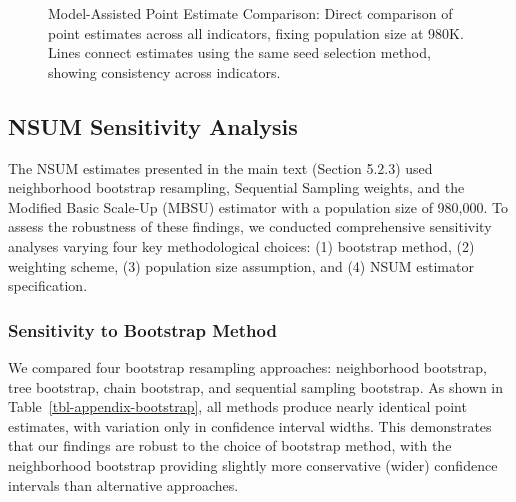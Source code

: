 \documentclass[
  12pt,
  letterpaper,
  DIV=11,
  numbers=noendperiod]{scrartcl}
\theoremstyle{plain}
\theoremstyle{definition}
\begin{document}
\begin{figure}[H]


\caption{\label{fig-ma-sensitivity-comparison}Model-Assisted Point
Estimate Comparison: Direct comparison of point estimates across all
indicators, fixing population size at 980K. Lines connect estimates
using the same seed selection method, showing consistency across
indicators.}

\end{figure}%

\subsection{NSUM Sensitivity Analysis}\label{app-nsum-sens}

The NSUM estimates presented in the main text (Section 5.2.3) used
neighborhood bootstrap resampling, Sequential Sampling weights, and the
Modified Basic Scale-Up (MBSU) estimator with a population size of
980,000. To assess the robustness of these findings, we conducted
comprehensive sensitivity analyses varying four key methodological
choices: (1) bootstrap method, (2) weighting scheme, (3) population size
assumption, and (4) NSUM estimator specification.

\subsubsection{Sensitivity to Bootstrap
Method}\label{sensitivity-to-bootstrap-method}

We compared four bootstrap resampling approaches: neighborhood
bootstrap, tree bootstrap, chain bootstrap, and sequential sampling
bootstrap. As shown in Table~\ref{tbl-appendix-bootstrap}, all methods
produce nearly identical point estimates, with variation only in
confidence interval widths. This demonstrates that our findings are
robust to the choice of bootstrap method, with the neighborhood
bootstrap providing slightly more conservative (wider) confidence
intervals than alternative approaches.
\end{document}
